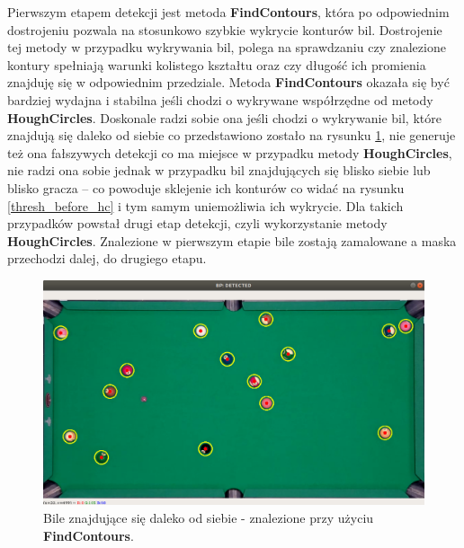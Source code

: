 \documentclass[12pt]{article}
\begin{document}
    Pierwszym etapem detekcji jest metoda \textbf{FindContours}, która po odpowiednim dostrojeniu pozwala na stosunkowo szybkie wykrycie konturów bil. Dostrojenie tej metody w przypadku wykrywania bil, polega na sprawdzaniu czy znalezione kontury spełniają warunki kolistego kształtu oraz czy długość ich promienia znajduję się w odpowiednim przedziale. Metoda \textbf{FindContours} okazała się być bardziej wydajna i stabilna jeśli chodzi o wykrywane współrzędne od metody \textbf{HoughCircles}. Doskonale radzi sobie ona jeśli chodzi o wykrywanie bil, które znajdują się daleko od siebie co przedstawiono zostało na rysunku \ref{bp_detected}, nie generuje też ona fałszywych detekcji co ma miejsce w przypadku metody \textbf{HoughCircles}, nie radzi ona sobie jednak w przypadku bil znajdujących się blisko siebie lub blisko gracza – co powoduje sklejenie ich konturów co widać na rysunku \ref{thresh_before_hc} i tym samym uniemożliwia ich wykrycie. Dla takich przypadków powstał drugi etap detekcji, czyli wykorzystanie metody \textbf{HoughCircles}. Znalezione w pierwszym etapie bile zostają zamalowane a maska przechodzi dalej, do drugiego etapu.
    \begin{figure}[!htb]
        \centering
        \includegraphics[width=15cm]{./images/obrazki/bp/bp_detected.png}
        \caption{Bile znajdujące się daleko od siebie - znalezione przy użyciu \textbf{FindContours}.}
        \label{bp_detected}
    \end{figure}
\end{document}
